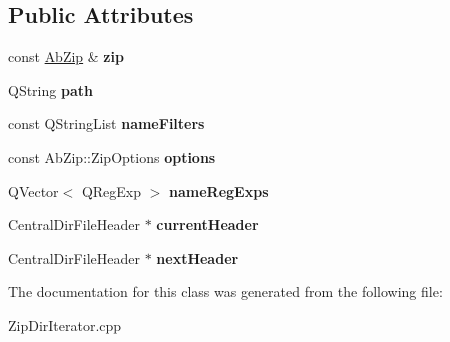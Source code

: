 \subsection*{Public Attributes}
\begin{DoxyCompactItemize}
\item 
const \hyperlink{class_ab_zip}{Ab\+Zip} \& {\bfseries zip}\hypertarget{class_zip_dir_iterator_private_a9f48e8cae7b192bd4df1e43274dfae12}{}\label{class_zip_dir_iterator_private_a9f48e8cae7b192bd4df1e43274dfae12}

\item 
Q\+String {\bfseries path}\hypertarget{class_zip_dir_iterator_private_a048b505297fc54cfa63859ccccf96f2f}{}\label{class_zip_dir_iterator_private_a048b505297fc54cfa63859ccccf96f2f}

\item 
const Q\+String\+List {\bfseries name\+Filters}\hypertarget{class_zip_dir_iterator_private_a37f4f6990f0c2de85199687b2995fe41}{}\label{class_zip_dir_iterator_private_a37f4f6990f0c2de85199687b2995fe41}

\item 
const Ab\+Zip\+::\+Zip\+Options {\bfseries options}\hypertarget{class_zip_dir_iterator_private_a5cc16eb4094cb28ac820e05e5f97d5b0}{}\label{class_zip_dir_iterator_private_a5cc16eb4094cb28ac820e05e5f97d5b0}

\item 
Q\+Vector$<$ Q\+Reg\+Exp $>$ {\bfseries name\+Reg\+Exps}\hypertarget{class_zip_dir_iterator_private_aee9f558a3de4a00b606201d705422800}{}\label{class_zip_dir_iterator_private_aee9f558a3de4a00b606201d705422800}

\item 
Central\+Dir\+File\+Header $\ast$ {\bfseries current\+Header}\hypertarget{class_zip_dir_iterator_private_a2ae62844d06fcd63d75d3c0e9917f647}{}\label{class_zip_dir_iterator_private_a2ae62844d06fcd63d75d3c0e9917f647}

\item 
Central\+Dir\+File\+Header $\ast$ {\bfseries next\+Header}\hypertarget{class_zip_dir_iterator_private_ac20f4dce68524de0bbb280b587965d6f}{}\label{class_zip_dir_iterator_private_ac20f4dce68524de0bbb280b587965d6f}

\end{DoxyCompactItemize}


The documentation for this class was generated from the following file\+:\begin{DoxyCompactItemize}
\item 
Zip\+Dir\+Iterator.\+cpp\end{DoxyCompactItemize}
